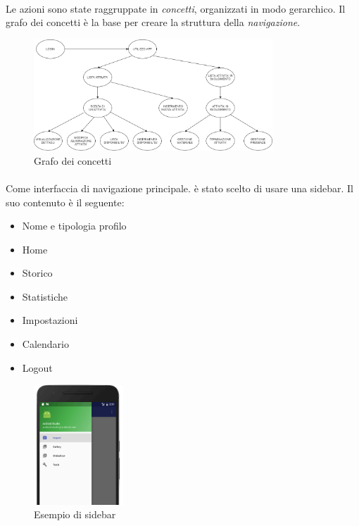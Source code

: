 \documentclass[12pt,a4paper,twoside,english,italian]{book}
\begin{document}
\paragraph{} Le azioni sono state raggruppate in \emph{concetti}, organizzati in modo gerarchico. Il grafo dei concetti è la base per creare la struttura della \emph{navigazione}. 

\begin{figure}[H]
    \centering
    \includegraphics[width=0.8\textwidth]{img/concetti task app.png}
    \caption{Grafo dei concetti}
\end{figure}

\newpage

\paragraph{} Come interfaccia di navigazione principale. è stato scelto di usare una sidebar. Il suo contenuto è il seguente: 
\begin{itemize}
    \item Nome e tipologia profilo
    \item Home
    \item Storico
    \item Statistiche
    \item Impostazioni
    \item Calendario
    \item Logout
\end{itemize}


\begin{figure}[H]
    \centering
    \includegraphics[width=0.3\textwidth]{img/sidebar-example.png}
    \caption{Esempio di sidebar}
\end{figure}
\end{document}
